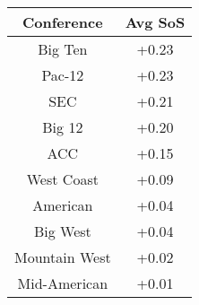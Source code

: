   \begin{tabular}{c|c}
    Conference      & Avg SoS\\
    \hline
    Big Ten         & +0.23\\
    Pac-12          & +0.23\\
    SEC             & +0.21\\
    Big 12          & +0.20\\
    ACC             & +0.15\\
    West Coast      & +0.09\\
    American        & +0.04\\
    Big West        & +0.04\\
    Mountain West   & +0.02\\
    Mid-American    & +0.01\\
  \end{tabular}